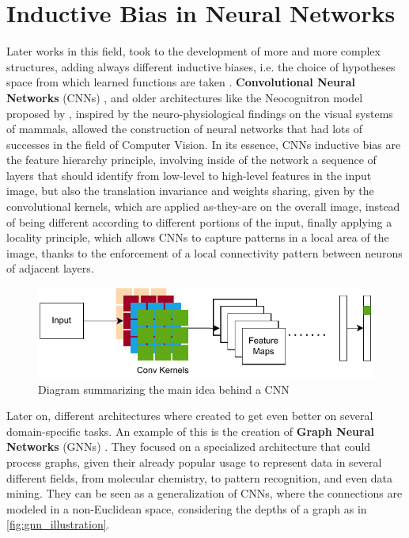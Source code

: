 \documentclass[../thesis.tex]{subfiles}
\begin{document}
\section{Inductive Bias in Neural Networks}
Later works in this field, took to the development of more and more complex structures, adding always different inductive biases, i.e. the choice of hypotheses space from which learned functions are taken \citep{cohen2016inductivebias}.
\textbf{Convolutional Neural Networks} (CNNs) \citep{krizhevsky2012imagenet}, and older architectures like the Neocognitron model proposed by \citeauthor{fukushima1980neocognitron}, inspired by the neuro-physiological findings on the visual systems of mammals, allowed the construction of neural networks that had lots of successes in the field of Computer Vision. In its essence, CNNs inductive bias are the feature hierarchy principle, involving inside of the network a sequence of layers that should identify from low-level to high-level features in the input image, but also the translation invariance and weights sharing, given by the convolutional kernels, which are applied as-they-are on the overall image, instead of being different according to different portions of the input, finally applying a locality principle, which allows CNNs to capture patterns in a local area of the image, thanks to the enforcement of a local connectivity pattern between neurons of adjacent layers.

\begin{figure}
    \centering
    \includegraphics[width=0.6\linewidth]{assets/CNN_Illustration.drawio.pdf}
    \caption{Diagram summarizing the main idea behind a CNN}
    \label{fig:cnn_illustration}
\end{figure}

Later on, different architectures where created to get even better on several domain-specific tasks.
An example of this is the creation of \textbf{Graph Neural Networks} (GNNs) \cite{introducinggraphneuralnetworksgnn}.
They focused on a specialized architecture that could process graphs, given their already popular usage to represent data in several different fields, from molecular chemistry, to pattern recognition, and even data mining. They can be seen as a generalization of CNNs, where the connections are modeled in a non-Euclidean space, considering the depths of a graph as in \cref{fig:gnn_illustration}.
\end{document}
